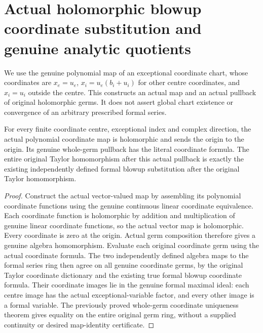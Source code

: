 \section{Actual holomorphic blowup coordinate substitution and genuine analytic quotients}

We use the genuine polynomial map of an exceptional coordinate chart, whose
coordinates are $x_e=u_e$, $x_i=u_e(b_i+u_i)$ for other centre coordinates,
and $x_i=u_i$ outside the centre. This constructs an actual map and an actual
pullback of original holomorphic germs. It does not assert global chart
existence or convergence of an arbitrary prescribed formal series.

\begin{theorem}
\label{hir:actual-analytic-blowup-coordinate-pullback-taylor-naturality}
\leanok
For every finite coordinate centre, exceptional index and complex direction,
the actual polynomial coordinate map is holomorphic and sends the origin to
the origin. Its genuine whole-germ pullback has the literal coordinate
formula. The entire original Taylor homomorphism after this actual pullback
is exactly the existing independently defined formal blowup substitution
after the original Taylor homomorphism.
\end{theorem}
\begin{proof}
Construct the actual vector-valued map by assembling its polynomial
coordinate functions using the genuine continuous linear coordinate equivalence. Each coordinate
function is holomorphic by addition and multiplication of genuine linear
coordinate functions, so the actual vector map is holomorphic. Every
coordinate is zero at the origin. Actual germ composition therefore gives a
genuine algebra homomorphism. Evaluate each original coordinate germ using
the actual coordinate formula. The two independently defined algebra maps
to the formal series ring then agree on all genuine coordinate germs, by the
original Taylor coordinate dictionary and the existing true formal blowup
coordinate formula. Their coordinate images lie in the genuine formal
maximal ideal: each centre image has the actual exceptional-variable factor,
and every other image is a formal variable. The previously proved whole-germ
coordinate uniqueness theorem gives equality on the entire original germ
ring, without a supplied continuity or desired map-identity certificate.
\end{proof}


